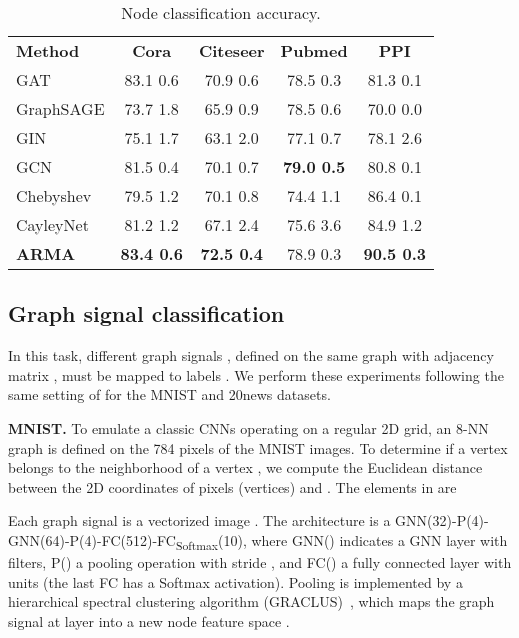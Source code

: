 \documentclass{article}
\begin{document}
\begin{table}
\caption{Node classification accuracy.}
\setlength\tabcolsep{.6em} \small
\centering
\bgroup
\def\arraystretch{1.0} \begin{tabular}{lcccc}
\cmidrule[1.5pt]{1-5}
\textbf{Method} & \textbf{Cora} & \textbf{Citeseer} & \textbf{Pubmed} & \textbf{PPI} \\
\cmidrule[.5pt]{1-5}
GAT                     & 83.1 {\tiny0.6} & 70.9 {\tiny0.6} & 78.5 {\tiny0.3} & 81.3 {\tiny0.1} \\ GraphSAGE               & 73.7 {\tiny1.8} & 65.9 {\tiny0.9} & 78.5 {\tiny0.6} & 70.0 {\tiny0.0} \\ GIN                     & 75.1 {\tiny1.7} & 63.1 {\tiny2.0} & 77.1 {\tiny0.7} & 78.1 {\tiny2.6} \\ \cmidrule[.5pt]{1-5}
GCN                     & 81.5 {\tiny0.4} & 70.1 {\tiny0.7} & \textbf{79.0 {\tiny0.5}} & 80.8 {\tiny0.1} \\ Chebyshev               & 79.5 {\tiny1.2} & 70.1 {\tiny0.8} & 74.4 {\tiny1.1} & 86.4 {\tiny0.1} \\ CayleyNet               & 81.2 {\tiny1.2} & 67.1 {\tiny2.4} & 75.6 {\tiny3.6} & 84.9 {\tiny1.2} \\ \textbf{ARMA}           & \textbf{83.4 {\tiny0.6}} & \textbf{72.5 {\tiny0.4}} & 78.9 {\tiny0.3} & \textbf{90.5 {\tiny0.3}} \\ \cmidrule[1.5pt]{1-5}
\end{tabular}
\label{tab:nodecl_res}
\egroup
\end{table}


\subsection{Graph signal classification}
In this task,  different graph signals , defined on the same graph with adjacency matrix , must be mapped to labels .
We perform these experiments following the same setting of \cite{defferrard2016convolutional} for the MNIST and 20news datasets.

\textbf{MNIST.} To emulate a classic CNNs operating on a regular 2D grid, an 8-NN graph is defined on the 784 pixels of the MNIST images. 
To determine if a vertex  belongs to the neighborhood  of a vertex , we compute the Euclidean distance between the 2D coordinates of pixels (vertices)  and .
The elements in  are  


Each graph signal is a vectorized image .
The architecture is a GNN(32)-P(4)-GNN(64)-P(4)-FC(512)-FC\textsubscript{Softmax}(10), where GNN() indicates a GNN layer with  filters, P() a pooling operation with stride , and FC() a fully connected layer with  units (the last FC has a Softmax activation).
Pooling is implemented by a hierarchical spectral clustering algorithm (GRACLUS)~\cite{dhillon2007weighted}, which maps the graph signal  at layer  into a new node feature space . 
\end{document}
